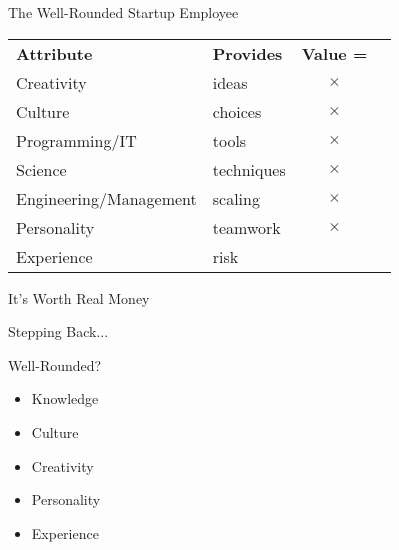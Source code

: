 \documentclass{beamer}
\begin{document}
\begin{frame}{The Well-Rounded Startup Employee}

\begin{centering}

\begin{tabular}{llcl}
\textbf{Attribute}         &  \textbf{Provides}  & \textbf{Value =} & \vspace{0.5cm} \\

Creativity                 &  ideas        & $\times$ & \\ 
Culture                    &  choices      & $\times$ & \vspace{0.5cm} \\ 

Programming/IT             &  tools        & $\times$ & \\
Science                    &  techniques   & $\times$ & \\
Engineering/Management     &  scaling      & $\times$ & \vspace{0.5cm} \\ 

Personality                &  teamwork     & $\times$ & \\
Experience                 &  risk         &
\end{tabular}

\end{centering}

\end{frame}

\begin{frame}{It's Worth Real Money}

  \begin{center}
  \end{center}

\end{frame}

\begin{frame}{Stepping Back...}

Well-Rounded?
\begin{itemize}
  \item Knowledge
  \item Culture
  \item Creativity
  \item Personality
  \item Experience
\end{itemize}

\end{frame}
\end{document}
